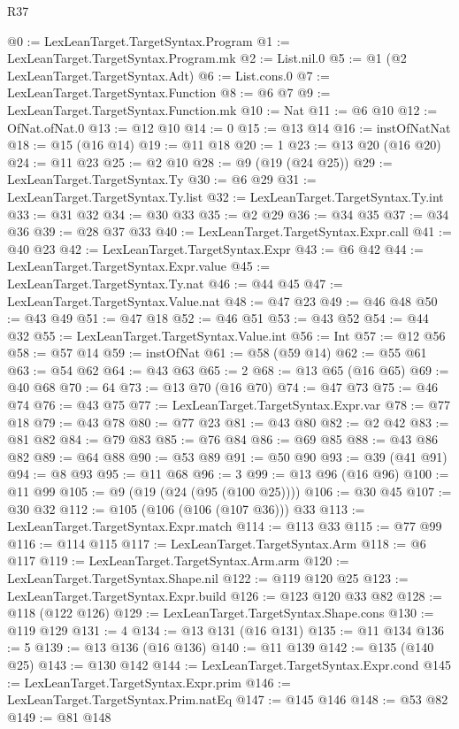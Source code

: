 \begin{lexlean}{R37}
\begin{coremodule}
@0 := LexLeanTarget.TargetSyntax.Program
@1 := LexLeanTarget.TargetSyntax.Program.mk
@2 := List.nil.{0}
@5 := @1 (@2 LexLeanTarget.TargetSyntax.Adt)
@6 := List.cons.{0}
@7 := LexLeanTarget.TargetSyntax.Function
@8 := @6 @7
@9 := LexLeanTarget.TargetSyntax.Function.mk
@10 := Nat
@11 := @6 @10
@12 := OfNat.ofNat.{0}
@13 := @12 @10
@14 := 0
@15 := @13 @14
@16 := instOfNatNat
@18 := @15 (@16 @14)
@19 := @11 @18
@20 := 1
@23 := @13 @20 (@16 @20)
@24 := @11 @23
@25 := @2 @10
@28 := @9 (@19 (@24 @25))
@29 := LexLeanTarget.TargetSyntax.Ty
@30 := @6 @29
@31 := LexLeanTarget.TargetSyntax.Ty.list
@32 := LexLeanTarget.TargetSyntax.Ty.int
@33 := @31 @32
@34 := @30 @33
@35 := @2 @29
@36 := @34 @35
@37 := @34 @36
@39 := @28 @37 @33
@40 := LexLeanTarget.TargetSyntax.Expr.call
@41 := @40 @23
@42 := LexLeanTarget.TargetSyntax.Expr
@43 := @6 @42
@44 := LexLeanTarget.TargetSyntax.Expr.value
@45 := LexLeanTarget.TargetSyntax.Ty.nat
@46 := @44 @45
@47 := LexLeanTarget.TargetSyntax.Value.nat
@48 := @47 @23
@49 := @46 @48
@50 := @43 @49
@51 := @47 @18
@52 := @46 @51
@53 := @43 @52
@54 := @44 @32
@55 := LexLeanTarget.TargetSyntax.Value.int
@56 := Int
@57 := @12 @56
@58 := @57 @14
@59 := instOfNat
@61 := @58 (@59 @14)
@62 := @55 @61
@63 := @54 @62
@64 := @43 @63
@65 := 2
@68 := @13 @65 (@16 @65)
@69 := @40 @68
@70 := 64
@73 := @13 @70 (@16 @70)
@74 := @47 @73
@75 := @46 @74
@76 := @43 @75
@77 := LexLeanTarget.TargetSyntax.Expr.var
@78 := @77 @18
@79 := @43 @78
@80 := @77 @23
@81 := @43 @80
@82 := @2 @42
@83 := @81 @82
@84 := @79 @83
@85 := @76 @84
@86 := @69 @85
@88 := @43 @86 @82
@89 := @64 @88
@90 := @53 @89
@91 := @50 @90
@93 := @39 (@41 @91)
@94 := @8 @93
@95 := @11 @68
@96 := 3
@99 := @13 @96 (@16 @96)
@100 := @11 @99
@105 := @9 (@19 (@24 (@95 (@100 @25))))
@106 := @30 @45
@107 := @30 @32
@112 := @105 (@106 (@106 (@107 @36))) @33
@113 := LexLeanTarget.TargetSyntax.Expr.match
@114 := @113 @33
@115 := @77 @99
@116 := @114 @115
@117 := LexLeanTarget.TargetSyntax.Arm
@118 := @6 @117
@119 := LexLeanTarget.TargetSyntax.Arm.arm
@120 := LexLeanTarget.TargetSyntax.Shape.nil
@122 := @119 @120 @25
@123 := LexLeanTarget.TargetSyntax.Expr.build
@126 := @123 @120 @33 @82
@128 := @118 (@122 @126)
@129 := LexLeanTarget.TargetSyntax.Shape.cons
@130 := @119 @129
@131 := 4
@134 := @13 @131 (@16 @131)
@135 := @11 @134
@136 := 5
@139 := @13 @136 (@16 @136)
@140 := @11 @139
@142 := @135 (@140 @25)
@143 := @130 @142
@144 := LexLeanTarget.TargetSyntax.Expr.cond
@145 := LexLeanTarget.TargetSyntax.Expr.prim
@146 := LexLeanTarget.TargetSyntax.Prim.natEq
@147 := @145 @146
@148 := @53 @82
@149 := @81 @148

\end{coremodule}
\end{lexlean}
